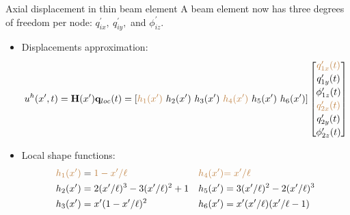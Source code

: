 \documentclass[aspectratio=169]{beamer}
\begin{document}
\begin{frame}{Axial displacement in thin beam element}
  A beam element now has three degrees of freedom per node: $q_{ix}^\prime,\  q_{iy}^\prime,$ and $\phi_{iz}^\prime$.

  \begin{itemize}
    \item Displacements approximation:
          $$u^h(x^\prime,t)=  \mathbf H(x^\prime)\mathbf q_{loc} (t)=[{\color{brown}h_1(x^\prime)}\ h_2(x^\prime)\  h_3(x^\prime)\ {\color{brown}h_4(x^\prime)}\  h_5(x^\prime)\ h_6(x^\prime)]\begin{bmatrix}
              {\color{brown} q_{1x}^\prime(t)} \\[2pt] q_{1y}^\prime(t) \\[2pt] \phi_{1z}^\prime(t)\\[2pt]  {\color{brown} q_{2x}^\prime(t)}\\[2pt]  q_{2y}^\prime(t)\\[2pt] \phi_{2z}^\prime(t)
            \end{bmatrix}$$
    \item Local shape functions:
          \begin{align*}
            {\color{brown}h_1(x^\prime)} & = {\color{brown}1-x^\prime/\ell}         & {\color{brown}h_4(x^\prime)} & {\color{brown}=x^\prime/\ell}             \\
            h_2(x^\prime)                & =2(x^\prime/\ell)^3-3(x^\prime/\ell)^2+1 & h_5(x^\prime)                & =3(x^\prime/\ell)^2-2(x^\prime/\ell)^3    \\
            h_3(x^\prime)                & =x^\prime(1-x^\prime/\ell)^2             & h_6(x^\prime)                & =x^\prime(x^\prime/\ell)(x^\prime/\ell-1) \\
          \end{align*}
  \end{itemize}
\end{frame}
\end{document}

